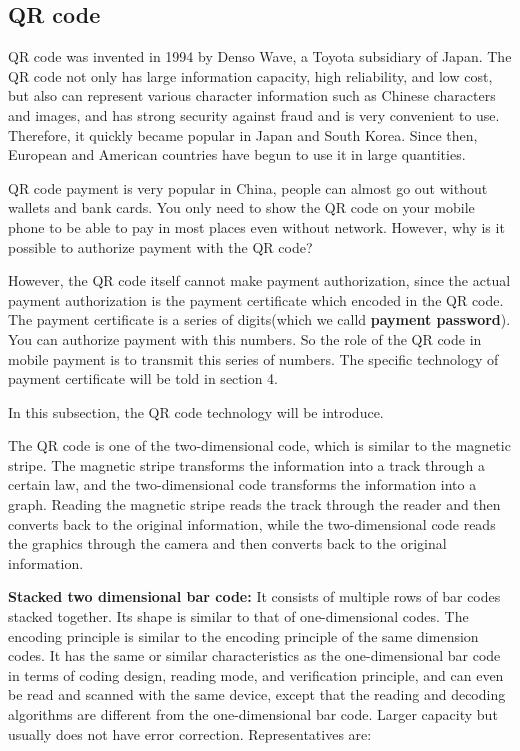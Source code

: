 \documentclass[journal]{IEEEtran}
\begin{document}
\subsection{QR code}
QR code was invented in 1994 by Denso Wave, a Toyota subsidiary of Japan. The QR code not only has large information capacity, high reliability, and low cost, but also can represent various character information such as Chinese characters and images, and has strong security against fraud and is very convenient to use. Therefore, it quickly became popular in Japan and South Korea. Since then, European and American countries have begun to use it in large quantities. 

QR code payment is very popular in China, people can almost go out without wallets and bank cards. You only need to show the QR code on your mobile phone to be able to pay in most places even without network. However, why is it possible to authorize payment with the QR code?

However, the QR code itself cannot make payment authorization, since the actual payment authorization is the payment certificate which encoded in the QR code. The payment certificate is a series of digits(which we calld \textbf{payment password}). You can authorize payment with this numbers. So the role of the QR code in mobile payment is to transmit this series of numbers. The specific technology of payment certificate will be told in section 4.

In this subsection, the QR code technology will be introduce.

The QR code is one of the two-dimensional code, which is similar to the magnetic stripe. The magnetic stripe transforms the information into a track through a certain law, and the two-dimensional code transforms the information into a graph. Reading the magnetic stripe reads the track through the reader and then converts back to the original information, while the two-dimensional code reads the graphics through the camera and then converts back to the original information.

\textbf{Stacked two dimensional bar code:} It consists of multiple rows of bar codes stacked together. Its shape is similar to that of one-dimensional codes. The encoding principle is similar to the encoding principle of the same dimension codes. It has the same or similar characteristics as the one-dimensional bar code in terms of coding design, reading mode, and verification principle, and can even be read and scanned with the same device, except that the reading and decoding algorithms are different from the one-dimensional bar code. Larger capacity but usually does not have error correction.
Representatives are:
\end{document}
